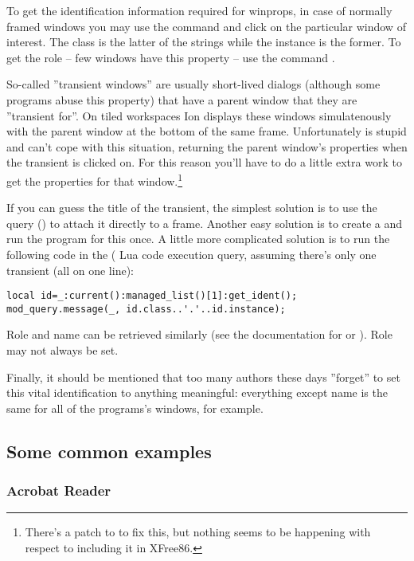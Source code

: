 To get the identification information required for winprops, in case of
normally framed windows you may use the command  
and click on the particular window of interest. The class is the latter of
the strings while the instance is the former. To get the role -- few windows
have this property -- use the command .

So-called ''transient windows'' are usually short-lived dialogs (although
some programs abuse this property) that have a parent window that they are
''transient for''. On tiled workspaces Ion displays these windows 
simulatenously with the parent window at the bottom of the same frame.
Unfortunately  is stupid and can't cope with this situation,
returning the parent window's properties when the transient is clicked on.
For this reason you'll have to do a little extra work to get the properties
for that window.\footnote{There's a patch to  to
fix this, but nothing seems to be happening with respect to including it in 
XFree86.}

If you can guess the title of the transient, the simplest solution
is to use the  query ()
to attach it directly to a frame. Another easy solution is to create
a  and run the program for this once. A little more
complicated solution is to run the following code in the 
( Lua code execution query, assuming there's
only one transient (all on one line):

\begin{verbatim}
local id=_:current():managed_list()[1]:get_ident();
mod_query.message(_, id.class..'.'..id.instance);
\end{verbatim}

Role and name can be retrieved similarly (see the documentation for
 or ). Role may not
always be set.

Finally, it should be mentioned that too many authors these days
''forget'' to set this vital identification to anything meaningful:
everything except name is the same for all of the programs's 
windows, for example.

\subsection{Some common examples}

\subsubsection{Acrobat Reader}

